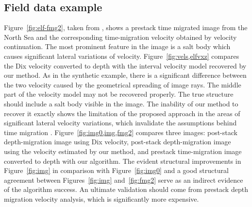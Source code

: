 \subsection{Field data example}





Figure~\ref{fig:elf-fmg2}, taken from \cite[]{fomel2003}, shows a
prestack time migrated image from the North Sea and the corresponding
time-migration velocity obtained by velocity continuation. The most
prominent feature in the image is a salt body which causes significant
lateral variations of velocity. Figure~\ref{fig:vels,elfvxz} compares
the Dix velocity converted to depth with the interval velocity model
recovered by our method. As in the synthetic example, there is a
significant difference between the two velocity caused by the
geometrical spreading of image rays. The middle part of the velocity
model may not be recovered properly. The true structure should include
a salt body visible in the image. The inability of our method to
recover it exactly shows the limitation of the proposed approach in the areas
of significant lateral velocity variations, which invalidate the
assumptions behind time migration
\cite[]{robein}. Figure~\ref{fig:img0,img,fmg2} compares three images:
post-stack depth-migration image using Dix velocity, post-stack
depth-migration image using the velocity estimated by our method, and
prestack time-migration image converted to depth with our
algorithm. The evident structural improvements in Figure~\ref{fig:img}
in comparison with Figure~\ref{fig:img0} and a good structural agreement between
Figures~\ref{fig:img} and~\ref{fig:fmg2} serve as an indirect evidence
of the algorithm success. An ultimate validation should come from
prestack depth migration velocity analysis, which is significantly
more expensive.

